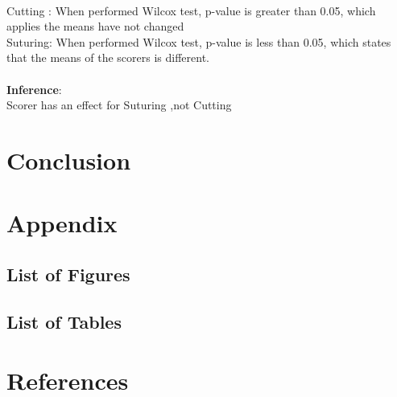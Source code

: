 \documentclass[12pt,epsf]{report}
\begin{document}
\\
Cutting : When performed Wilcox test, p-value is greater than 0.05, which applies the means have not changed\\
Suturing: When performed Wilcox test, p-value is less than 0.05, which states that the means of the scorers is different. \\
\\
\textbf{Inference}:\\
Scorer has an effect for Suturing ,not Cutting\\







\newpage
\section*{Conclusion}



\newpage
\section*{Appendix}
\subsection*{List of Figures}
\subsection*{List of Tables}


\newpage
\section*{References}
\end{document}
